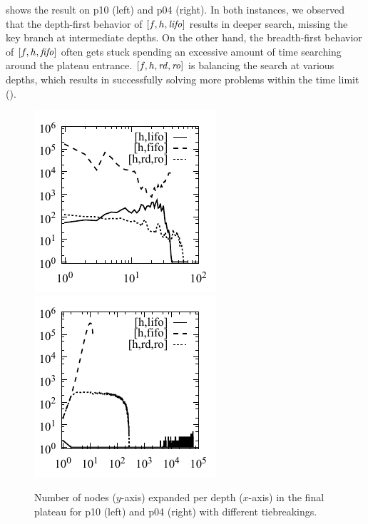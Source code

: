  shows the result
on
  p10 (left) and
  p04 (right).
In both instances, 
we observed that the depth-first behavior of $[f,h,{\mbox{\textit{lifo}}}]$ results in 
deeper search, missing the key branch at intermediate depths.
On the other hand, the breadth-first behavior of $[f,h,{\mbox{\textit{fifo}}}]$ often gets stuck spending an excessive amount of time searching around the plateau entrance.
$[f,h,{\mbox{\textit{rd}}},{\mbox{\textit{ro}}}]$ is balancing the search at various depths, which results in successfully solving more problems within the time limit (). %


\begin{figure}[tb]
 \centering {}
 \hfill
 \includegraphics{tables/aaai16-log-rd/aaai16prelim3/depth-histogram-openstacks-opt11-strips-p10.pdf}
 \hfill
 \includegraphics{tables/aaai16-log-rd/2zerocost/depth-histogram-woodworking-cut-p04.pdf}
 \hfill
 \caption{Number of nodes ($y$-axis) expanded per depth ($x$-axis) in
 the final plateau for 
  p10 
 (left)
 and
  p04
 (right)
 with different tiebreakings.
 }
 \label{fig:depth-histogram}
\end{figure}

